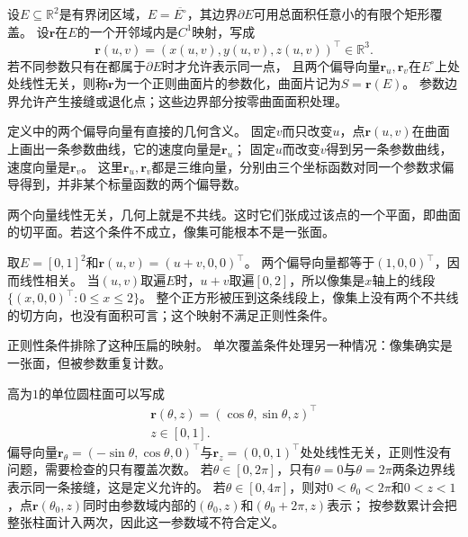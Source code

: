 \begin{definition}[正则参数曲面片]
\label{def:analysis-regular-surface-patch}
设$E\subseteq\mathbb R^2$是有界闭区域，$E=\overline{E^\circ}$，其边界$\partial E$可用总面积任意小的有限个矩形覆盖。
设$\bm r$在$E$的一个开邻域内是$C^1$映射，写成
\[
 \bm r(u,v)=(x(u,v),y(u,v),z(u,v))^\top\in\mathbb R^3.
\]
若不同参数只有在都属于$\partial E$时才允许表示同一点，
且两个偏导向量$\bm r_u,\bm r_v$在$E^\circ$上处处线性无关，则称$\bm r$为一个正则曲面片的参数化，曲面片记为$S=\bm r(E)$。
参数边界允许产生接缝或退化点；这些边界部分按零曲面面积处理。
\end{definition}

定义中的两个偏导向量有直接的几何含义。
固定$v$而只改变$u$，点$\bm r(u,v)$在曲面上画出一条参数曲线，它的速度向量是$\bm r_u$；
固定$u$而改变$v$得到另一条参数曲线，速度向量是$\bm r_v$。
这里$\bm r_u,\bm r_v$都是三维向量，分别由三个坐标函数对同一个参数求偏导得到，并非某个标量函数的两个偏导数。

两个向量线性无关，几何上就是不共线。这时它们张成过该点的一个平面，即曲面的切平面。若这个条件不成立，像集可能根本不是一张面。

\begin{example}[像集退化为线段的参数映射]
取$E=[0,1]^2$和$\bm r(u,v)=(u+v,0,0)^\top$。
两个偏导向量都等于$(1,0,0)^\top$，因而线性相关。
当$(u,v)$取遍$E$时，$u+v$取遍$[0,2]$，所以像集是$x$轴上的线段$\{(x,0,0)^\top:0\leq x\leq2\}$。
整个正方形被压到这条线段上，像集上没有两个不共线的切方向，也没有面积可言；这个映射不满足正则性条件。
\end{example}

正则性条件排除了这种压扁的映射。
单次覆盖条件处理另一种情况：像集确实是一张面，但被参数重复计数。

\begin{example}[圆柱面的单次覆盖与二重覆盖]
\label{ex:analysis-cylinder-double-cover}
高为$1$的单位圆柱面可以写成
\[
\begin{gathered}
\bm r(\theta,z)=(\cos\theta,\sin\theta,z)^\top\\
z\in[0,1].
\end{gathered}
\]
偏导向量$\bm r_\theta=(-\sin\theta,\cos\theta,0)^\top$与$\bm r_z=(0,0,1)^\top$处处线性无关，正则性没有问题，需要检查的只有覆盖次数。
若$\theta\in[0,2\pi]$，只有$\theta=0$与$\theta=2\pi$两条边界线表示同一条接缝，这是定义允许的。
若$\theta\in[0,4\pi]$，则对$0<\theta_0<2\pi$和$0<z<1$，点$\bm r(\theta_0,z)$同时由参数域内部的$(\theta_0,z)$和$(\theta_0+2\pi,z)$表示；
按参数累计会把整张柱面计入两次，因此这一参数域不符合定义。
\end{example}

